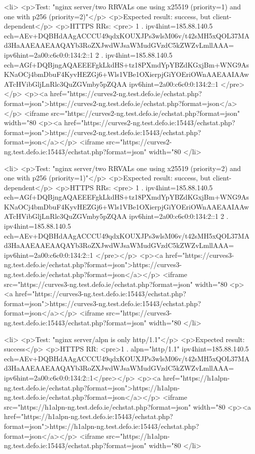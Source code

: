 <li>
<p>Test: "nginx server/two RRVALs one using x25519 (priority=1) and one with p256 (priority=2)"</p>
<p>Expected result: success, but client-dependent</p>
<p>HTTPS RRs: <pre>
1 . ipv4hint=185.88.140.5 ech=AEv+DQBHdAAgACCCU49qdxKOUXJPs3wlsM06v/t42sMH5xQOL37MAd3HaAAEAAEAAQAYb3RoZXJwdWJsaWMudGVzdC5kZWZvLmllAAA= ipv6hint=2a00:c6c0:0:134:2::1
2 . ipv4hint=185.88.140.5 ech=AGf+DQBjngAQAEEEFgkLkdHS+tz18PXmdYpYBZdKGxjBm+WNG9AsKNaOCj4bmDbuF4KyvHEZGj6+Wls1VBe1OXierpjGiYOEriOWnAAEAAIAAwATcHVibGljLnRlc3QuZGVmby5pZQAA ipv6hint=2a00:c6c0:0:134:2::1
</pre></p>
<p><a href="https://curves2-ng.test.defo.ie/echstat.php?format=json">https://curves2-ng.test.defo.ie/echstat.php?format=json</a></p>
<iframe src="https://curves2-ng.test.defo.ie/echstat.php?format=json" width="80%
<p><a href="https://curves2-ng.test.defo.ie:15443/echstat.php?format=json">https://curves2-ng.test.defo.ie:15443/echstat.php?format=json</a></p>
<iframe src="https://curves2-ng.test.defo.ie:15443/echstat.php?format=json" width="80%
</li>

<li>
<p>Test: "nginx server/two RRVALs one using x25519 (priority=2) and one with p256 (priority=1)"</p>
<p>Expected result: success, but client-dependent</p>
<p>HTTPS RRs: <pre>
1 . ipv4hint=185.88.140.5 ech=AGf+DQBjngAQAEEEFgkLkdHS+tz18PXmdYpYBZdKGxjBm+WNG9AsKNaOCj4bmDbuF4KyvHEZGj6+Wls1VBe1OXierpjGiYOEriOWnAAEAAIAAwATcHVibGljLnRlc3QuZGVmby5pZQAA ipv6hint=2a00:c6c0:0:134:2::1
2 . ipv4hint=185.88.140.5 ech=AEv+DQBHdAAgACCCU49qdxKOUXJPs3wlsM06v/t42sMH5xQOL37MAd3HaAAEAAEAAQAYb3RoZXJwdWJsaWMudGVzdC5kZWZvLmllAAA= ipv6hint=2a00:c6c0:0:134:2::1
</pre></p>
<p><a href="https://curves3-ng.test.defo.ie/echstat.php?format=json">https://curves3-ng.test.defo.ie/echstat.php?format=json</a></p>
<iframe src="https://curves3-ng.test.defo.ie/echstat.php?format=json" width="80%
<p><a href="https://curves3-ng.test.defo.ie:15443/echstat.php?format=json">https://curves3-ng.test.defo.ie:15443/echstat.php?format=json</a></p>
<iframe src="https://curves3-ng.test.defo.ie:15443/echstat.php?format=json" width="80%
</li>

<li>
<p>Test: "nginx server/alpn is only http/1.1"</p>
<p>Expected result: success</p>
<p>HTTPS RR: <pre>1 . alpn="http/1.1" ipv4hint=185.88.140.5 ech=AEv+DQBHdAAgACCCU49qdxKOUXJPs3wlsM06v/t42sMH5xQOL37MAd3HaAAEAAEAAQAYb3RoZXJwdWJsaWMudGVzdC5kZWZvLmllAAA= ipv6hint=2a00:c6c0:0:134:2::1</pre></p>
<p><a href="https://h1alpn-ng.test.defo.ie/echstat.php?format=json">https://h1alpn-ng.test.defo.ie/echstat.php?format=json</a></p>
<iframe src="https://h1alpn-ng.test.defo.ie/echstat.php?format=json" width="80%
<p><a href="https://h1alpn-ng.test.defo.ie:15443/echstat.php?format=json">https://h1alpn-ng.test.defo.ie:15443/echstat.php?format=json</a></p>
<iframe src="https://h1alpn-ng.test.defo.ie:15443/echstat.php?format=json" width="80%
</li>

